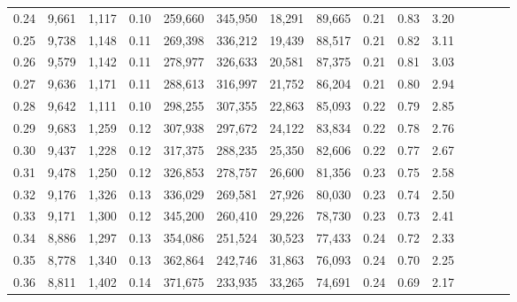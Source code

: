 \begin{tabular}{rrrcrrrrrrrrrrr}
0.24 &   9,661 &   1,117 &                                       0.10 &  259,660 &  345,950 &   18,291 &   89,665 &  0.21 &  0.83 &                         3.20 \\
0.25 &   9,738 &   1,148 &                                       0.11 &  269,398 &  336,212 &   19,439 &   88,517 &  0.21 &  0.82 &                         3.11 \\
0.26 &   9,579 &   1,142 &                                       0.11 &  278,977 &  326,633 &   20,581 &   87,375 &  0.21 &  0.81 &                         3.03 \\
0.27 &   9,636 &   1,171 &                                       0.11 &  288,613 &  316,997 &   21,752 &   86,204 &  0.21 &  0.80 &                         2.94 \\
0.28 &   9,642 &   1,111 &                                       0.10 &  298,255 &  307,355 &   22,863 &   85,093 &  0.22 &  0.79 &                         2.85 \\
0.29 &   9,683 &   1,259 &                                       0.12 &  307,938 &  297,672 &   24,122 &   83,834 &  0.22 &  0.78 &                         2.76 \\
0.30 &   9,437 &   1,228 &                                       0.12 &  317,375 &  288,235 &   25,350 &   82,606 &  0.22 &  0.77 &                         2.67 \\
0.31 &   9,478 &   1,250 &                                       0.12 &  326,853 &  278,757 &   26,600 &   81,356 &  0.23 &  0.75 &                         2.58 \\
0.32 &   9,176 &   1,326 &                                       0.13 &  336,029 &  269,581 &   27,926 &   80,030 &  0.23 &  0.74 &                         2.50 \\
0.33 &   9,171 &   1,300 &                                       0.12 &  345,200 &  260,410 &   29,226 &   78,730 &  0.23 &  0.73 &                         2.41 \\
0.34 &   8,886 &   1,297 &                                       0.13 &  354,086 &  251,524 &   30,523 &   77,433 &  0.24 &  0.72 &                         2.33 \\
0.35 &   8,778 &   1,340 &                                       0.13 &  362,864 &  242,746 &   31,863 &   76,093 &  0.24 &  0.70 &                         2.25 \\
0.36 &   8,811 &   1,402 &                                       0.14 &  371,675 &  233,935 &   33,265 &   74,691 &  0.24 &  0.69 &                         2.17 \\

\end{tabular}

